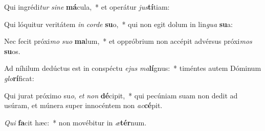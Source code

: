 \item Qui ingrédi\textit{tur} \textit{si}\textit{ne} \textbf{má}cula,~* et operátur \textit{jus}\textbf{tí}tiam:
\item Qui lóquitur veritátem \textit{in} \textit{cor}\textit{de} \textbf{su}o,~* qui non egit dolum in lin\textit{gua} \textbf{su}a:
\item Nec fecit próxi\textit{mo} \textit{su}\textit{o} \textbf{ma}lum,~* et oppróbrium non accépit advérsus próxi\textit{mos} \textbf{su}os.
\item Ad níhilum dedúctus est in conspéctu \textit{e}\textit{jus} \textit{ma}\textbf{lí}gnus:~* timéntes autem Dóminum \textit{glo}\textbf{rí}ficat:
\item Qui jurat próximo su\textit{o}, \textit{et} \textit{non} \textbf{dé}cipit,~* qui pecúniam suam non dedit ad usúram, et múnera super innocéntem non \textit{ac}\textbf{cé}pit.
\item \textit{Qui} \textbf{fa}cit hæc:~* non movébitur in \textit{æ}\textbf{tér}num.
